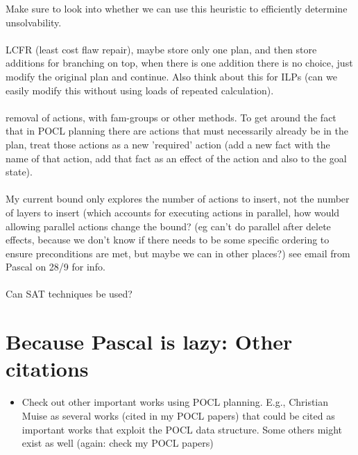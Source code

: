 \documentclass[runningheads]{llncs}
\begin{document}
Make sure to look into whether we can use this heuristic to efficiently determine unsolvability.
\\\\
LCFR (least cost flaw repair), maybe store only one plan, and then store additions for branching on top, when there is one addition there is no choice, just modify the original plan and continue. Also think about this for ILPs (can we easily modify this without using loads of repeated calculation).
\\\\
removal of actions, with fam-groups or other methods. To get around the fact that in POCL planning there are actions that must necessarily already be in the plan, treat those actions as a new 'required' action (add a new fact with the name of that action, add that fact as an effect of the action and also to the goal state).\\\\
My current bound only explores the number of actions to insert, not the number of layers to insert (which accounts for executing actions in parallel, how would allowing parallel actions change the bound? (eg can't do parallel after delete effects, because we don't know if there needs to be some specific ordering to ensure preconditions are met, but maybe we can in other places?) see email from Pascal on 28/9 for info.\\\\
Can SAT techniques be used?


\section{Because Pascal is lazy: Other citations}

\begin{itemize}
  \item Check out other important works using POCL planning. E.g., Christian Muise as several works (cited in my POCL papers) that could be cited as important works that exploit the POCL data structure. Some others might exist as well (again: check my POCL papers)
\end{itemize}




\end{document}
